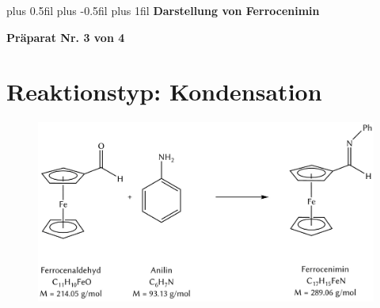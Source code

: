 \documentclass[12pt]{article}
\begin{document}
\begingroup
\leftskip=0cm plus 0.5fil \rightskip=0cm plus -0.5fil
\parfillskip=0cm plus 1fil
 \textbf{\large Darstellung von Ferrocenimin}\par
\endgroup

\begin{center}
 \textbf{Präparat Nr. 3 von 4}
\end{center}
\section{Reaktionstyp: \textnormal{Kondensation} }
\begin{figure}[ht]
\centering
\includegraphics[width=\textwidth]{reaktion.png}
\end{figure}
\end{document}
